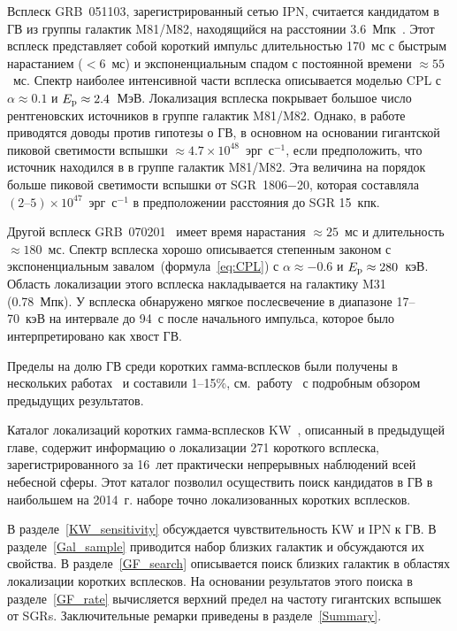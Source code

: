 Всплеск GRB~051103, зарегистрированный сетью IPN, считается 
кандидатом в ГВ из группы галактик M81/M82, находящийся на расстоянии 
3.6~Мпк~\citep{Ofek_2006ApJ, Frederiks_2007AstLett, Hurley2010}. 
Этот всплеск представляет собой короткий импульс длительностью 170~мс с быстрым 
нарастанием ($<6$~мс) и экспоненциальным спадом с постоянной времени $\approx 55$~мс. 
Спектр наиболее интенсивной части всплеска описывается моделью 
CPL с $\alpha \approx 0.1$ и $E_{\mathrm{p}} \approx 2.4$~МэВ. Локализация всплеска 
покрывает большое число рентгеновских источников в группе галактик M81/M82. Однако, 
в работе~\citep{Hurley2010} приводятся доводы против гипотезы о ГВ, в основном 
на основании гигантской пиковой светимости вспышки $\approx 4.7\times10^{48}$~эрг~с$^{-1}$,
если предположить, что источник находился в в группе галактик M81/M82.
Эта величина на порядок больше пиковой светимости вспышки от SGR~1806$-$20, которая 
составляла $(2\textrm{--}5)\times 10^{47}$~эрг~с$^{-1}$ в предположении 
расстояния до SGR 15~кпк.

Другой всплеск GRB~070201~\citep{Mazets_2008ApJ,Ofek_2008ApJ} имеет время нарастания $\approx 25$~мс 
и длительность $\approx 180$~мс. Спектр всплеска хорошо описывается степенным законом 
с экспоненциальным завалом~(формула~\ref{eq:CPL}) с $\alpha\approx-0.6$ и $E_{\mathrm{p}}\approx 280$~кэВ. 
Область локализации этого всплеска накладывается на галактику M31 (0.78~Мпк). У всплеска обнаружено 
мягкое послесвечение в диапазоне 17--70~кэВ на интервале до 94~с после начального 
импульса, которое было интерпретировано как хвост ГВ.

Пределы на долю ГВ среди коротких гамма-всплесков были получены в нескольких 
работах~\citep{Lazzati2005,Palmer2005,Nakar2006ApJ,Popov2006,Ofek_2007ApJ,Tikhomirova2010AstL} 
и составили 1--15\%, см.~работу~\citep{Hurley2011} с подробным обзором предыдущих результатов.

Каталог локализаций коротких гамма-всплесков KW~\citep{Palshin2013}, 
описанный в предыдущей главе, содержит информацию о локализации 271 короткого 
всплеска, зарегистрированного за 16~лет практически непрерывных наблюдений всей 
небесной сферы. Этот каталог позволил осуществить поиск кандидатов в ГВ 
в наибольшем на 2014~г. наборе точно локализованных коротких всплесков.

В разделе~\ref{KW_sensitivity} обсуждается чувствительность KW и IPN к ГВ.
В разделе~\ref{Gal_sample} приводится набор близких галактик и обсуждаются их свойства. 
В разделе~\ref{GF_search} описывается поиск близких галактик в областях локализации 
коротких всплесков. На основании результатов этого поиска в разделе~\ref{GF_rate} 
вычисляется верхний предел на частоту гигантских вспышек от SGRs. Заключительные 
ремарки приведены в разделе~\ref{Summary}.

